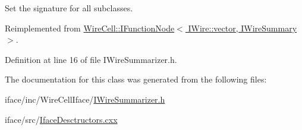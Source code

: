 Set the signature for all subclasses. 



Reimplemented from \hyperlink{class_wire_cell_1_1_i_function_node_af59f46cf19ca9fdf4aade1f289feedf2}{Wire\+Cell\+::\+I\+Function\+Node$<$ I\+Wire\+::vector, I\+Wire\+Summary $>$}.



Definition at line 16 of file I\+Wire\+Summarizer.\+h.



The documentation for this class was generated from the following files\+:\begin{DoxyCompactItemize}
\item 
iface/inc/\+Wire\+Cell\+Iface/\hyperlink{_i_wire_summarizer_8h}{I\+Wire\+Summarizer.\+h}\item 
iface/src/\hyperlink{_iface_desctructors_8cxx}{Iface\+Desctructors.\+cxx}\end{DoxyCompactItemize}
